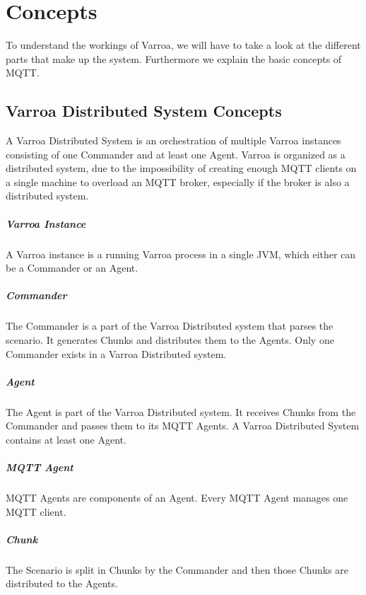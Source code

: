 \chapter{Concepts}
To understand the workings of Varroa, we will have to take a look at the different parts that make up the system.
Furthermore we explain the basic concepts of MQTT.

\section{Varroa Distributed System Concepts}
A Varroa Distributed System is an orchestration of multiple Varroa instances consisting of one Commander and at least one Agent.
Varroa is organized as a distributed system, due to the impossibility of creating enough MQTT clients on a single machine to overload an MQTT broker, especially if the broker is also a distributed system.

\paragraph{Varroa Instance}
A Varroa instance is a running Varroa process in a single JVM, which either can be a Commander or an Agent.

\paragraph{Commander}
The Commander is a part of the Varroa Distributed system that parses the scenario.
It generates Chunks and distributes them to the Agents.
Only one Commander exists in a Varroa Distributed system.

\paragraph{Agent}
The Agent is part of the Varroa Distributed system.
It receives Chunks from the Commander and passes them to its MQTT Agents.
A Varroa Distributed System contains at least one Agent.

\paragraph{MQTT Agent}
MQTT Agents are components of an Agent.
Every MQTT Agent manages one MQTT client.

\paragraph{Chunk}
The Scenario is split in Chunks by the Commander and then those Chunks are distributed to the Agents.

